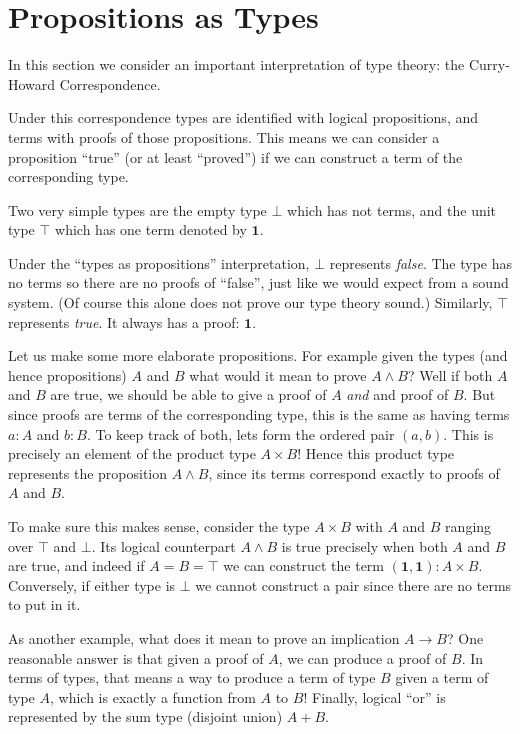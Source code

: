 \section{Propositions as Types}

In this section we consider an important interpretation of type theory: the
Curry-Howard Correspondence.

Under this correspondence types are identified with logical propositions, and
terms with proofs of those propositions. This means we can consider a
proposition ``true'' (or at least ``proved'') if we can construct a term of the
corresponding type.

Two very simple types are the empty type $\bot$ which has not terms, and the
unit type $\top$ which has one term denoted by $\mathbf{1}$.

Under the ``types as propositions'' interpretation, $\bot$ represents
\emph{false}. The type has no terms so there are no proofs of ``false'', just
like we would expect from a sound system. (Of course this alone does not prove
our type theory sound.) Similarly, $\top$ represents \emph{true}. It always has
a proof: $\mathbf{1}$.

Let us make some more elaborate propositions. For example given the types (and
hence propositions) $A$ and $B$ what would it mean to prove $A \land B$? Well if
both $A$ and $B$ are true, we should be able to give a proof of $A$ \emph{and}
and proof of $B$. But since proofs are terms of the corresponding type, this is
the same as having terms $a : A$ and $b : B$. To keep track of both, lets form
the ordered pair $(a, b)$. This is precisely an element of the product type $A
\times B$! Hence this product type represents the proposition $A \land B$, since
its terms correspond exactly to proofs of $A$ and $B$.

To make sure this makes sense, consider the type $A \times B$ with $A$ and $B$
ranging over $\top$ and $\bot$. Its logical counterpart $A \land B$ is true
precisely when both $A$ and $B$ are true, and indeed if $A = B = \top$ we can
construct the term $(\mathbf{1}, \mathbf{1}) : A \times B$. Conversely, if
either type is $\bot$ we cannot construct a pair since there are no terms to put
in it.

As another example, what does it mean to prove an implication $A \rightarrow B$?
One reasonable answer is that given a proof of $A$, we can produce a proof of
$B$. In terms of types, that means a way to produce a term of type $B$ given a
term of type $A$, which is exactly a function from $A$ to $B$! Finally,
logical ``or'' is represented by the sum type (disjoint union) $A + B$.

